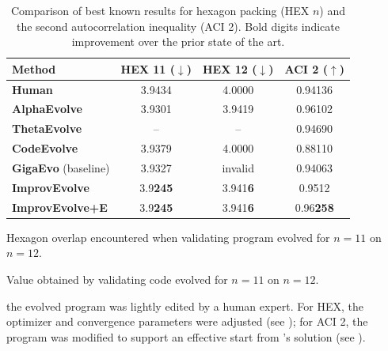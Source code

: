 \documentclass[sigconf]{acmart}
\begin{document}
\begin{table}[t]
    \centering
    \begin{threeparttable}
        \caption{Comparison of best known results for hexagon packing (HEX $n$) and the second autocorrelation inequality (ACI 2). Bold digits indicate improvement over the prior state of the art.}
        \label{tab:new_sota_transposed}
        \small
        \setlength{\tabcolsep}{1.5mm}
        \begin{tabular}{l|c|c|c}
            \toprule
            \textbf{Method} & \textbf{HEX 11} ($\downarrow$) & \textbf{HEX 12} ($\downarrow$) & \textbf{ACI 2} ($\uparrow$) \\
            \midrule
            \textbf{Human} & 3.9434 \cite{friedman2025packing} & 4.0000 \cite{friedman2025packing} & 0.94136 \cite{jaech2025secondcorrhuman} \\
            \textbf{AlphaEvolve} & 3.9301 \cite{novikov2025alphaevolve} & 3.9419 \cite{novikov2025alphaevolve} & 0.96102 \cite{georgiev2025mathematical} \\
            \textbf{ThetaEvolve}\cite{wang2025thetaevolve} & -- & -- & 0.94690 \\
            \textbf{CodeEvolve}\cite{assumpção2026codeevolveopensourceevolutionary} & 3.9379 & 4.0000 & 0.88110 \\
            \textbf{GigaEvo}\cite{khrulkov2025gigaevo} (baseline) & 3.9327 & invalid\tnote{1} & 0.94063 \\
            \textbf{ImprovEvolve} & 3.9\textbf{245} & 3.941\textbf{6}\tnote{2} & 0.9512 \\
            \textbf{ImprovEvolve+E\tnote{3}} & 3.9\textbf{245} & 3.941\textbf{6} & 0.96\textbf{258} \\
            \bottomrule
        \end{tabular}
        \begin{tablenotes}
            \footnotesize
            \item[1] Hexagon overlap encountered when validating program evolved for $n = 11$ on $n = 12$.
            \item[2] Value obtained by validating code evolved for $n = 11$ on $n = 12$.
            \item[3] \improvevolvepluse\: the evolved program was lightly edited by a human expert. For HEX, the optimizer and convergence parameters were adjusted (see ); for ACI 2, the program was modified to support an effective start from \alphaevolve's solution (see ).
        \end{tablenotes}
    \end{threeparttable}
\end{table}
\end{document}
